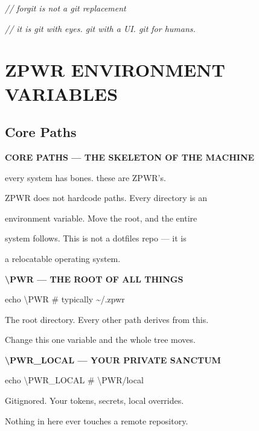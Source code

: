 \documentclass[11pt,a4paper,twoside]{book}
\begin{document}
{\small\itshape\color{dimtext} // forgit is not a git replacement}

{\small\itshape\color{dimtext} // it is git with eyes. git with a UI. git for humans.}


\vspace{16pt}


\chapter{ZPWR ENVIRONMENT VARIABLES}

\section{Core Paths}


\vspace{10pt}
{\large\bfseries\color{neoncyan} CORE PATHS — THE SKELETON OF THE MACHINE}\vspace{6pt}

every system has bones. these are ZPWR's.

ZPWR does not hardcode paths. Every directory is an

environment variable. Move the root, and the entire

system follows. This is not a dotfiles repo — it is

a relocatable operating system.


\vspace{12pt}
{\bfseries\color{neonyellow} \textbackslash{}PWR — THE ROOT OF ALL THINGS}\vspace{4pt}

\begin{codebox}
echo \textbackslash{}PWR   \# typically \textasciitilde{}/.zpwr\\
\end{codebox}

The root directory. Every other path derives from this.

Change this one variable and the whole tree moves.


\vspace{12pt}
{\bfseries\color{neonyellow} \textbackslash{}PWR\_LOCAL — YOUR PRIVATE SANCTUM}\vspace{4pt}

echo \textbackslash{}PWR\_LOCAL   \# \textbackslash{}PWR/local

Gitignored. Your tokens, secrets, local overrides.

Nothing in here ever touches a remote repository.
\end{document}
